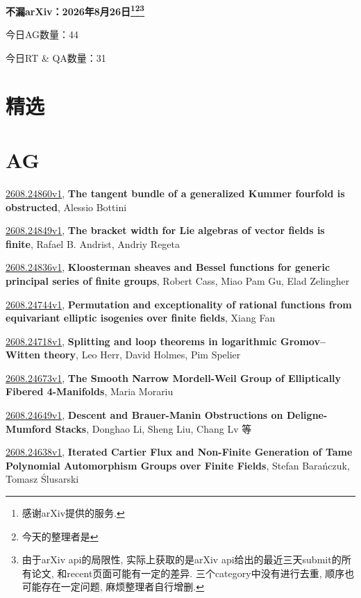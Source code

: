 \documentclass[9pt, a4paper]{article}
\theoremstyle{plain}
\theoremstyle{definition}
\theoremstyle{remark}
\newcommand{\arxiv}[3]{\href{https://arxiv.org/abs/#1}{#1}, \textbf{\textcolor{arxivblue}{#2}}, #3}
\newcommand{\AGnumber}{44}
\newcommand{\RTQAnumber}{31}
\newcommand{\NewestDate}{2026年8月26日}
\newcommand{\todayarXiver}{} %
\begin{document}
\begin{center}
    \Huge\textbf{不漏arXiv：\NewestDate\footnote{感谢arXiv提供的服务.}\footnote{今天的整理者是\todayarXiver}\footnote{由于arXiv api的局限性, 实际上获取的是arXiv api给出的最近三天submit的所有论文, 和recent页面可能有一定的差异. 三个category中没有进行去重, 顺序也可能存在一定问题, 麻烦整理者自行增删.}} \\
\end{center}

\setcounter{section}{-1}

\begin{center}
    今日AG数量：\AGnumber
    
    今日RT \& QA数量：\RTQAnumber
    
\end{center}


\section{精选}


\section{AG}
\arxiv{2608.24860v1}{The tangent bundle of a generalized Kummer fourfold is obstructed}{Alessio Bottini}

\arxiv{2608.24849v1}{The bracket width for Lie algebras of vector fields is finite}{Rafael B. Andrist, Andriy Regeta}

\arxiv{2608.24836v1}{Kloosterman sheaves and Bessel functions for generic principal series of finite groups}{Robert Cass, Miao Pam Gu, Elad Zelingher}

\arxiv{2608.24744v1}{Permutation and exceptionality of rational functions from equivariant elliptic isogenies over finite fields}{Xiang Fan}

\arxiv{2608.24718v1}{Splitting and loop theorems in logarithmic Gromov--Witten theory}{Leo Herr, David Holmes, Pim Spelier}

\arxiv{2608.24673v1}{The Smooth Narrow Mordell-Weil Group of Elliptically Fibered 4-Manifolds}{Maria Morariu}

\arxiv{2608.24649v1}{Descent and Brauer-Manin Obstructions on Deligne-Mumford Stacks}{Donghao Li, Sheng Liu, Chang Lv 等}

\arxiv{2608.24638v1}{Iterated Cartier Flux and Non-Finite Generation of Tame Polynomial Automorphism Groups over Finite Fields}{Stefan Barańczuk, Tomasz Ślusarski}
\end{document}
